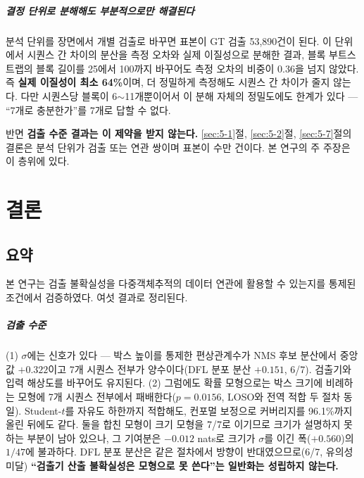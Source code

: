 \documentclass[12pt,a4paper,oneside]{report}
\begin{document}
\paragraph{결정 단위로 분해해도 부분적으로만 해결된다} 분석 단위를 장면에서 개별 검출로 바꾸면 표본이 GT 검출 53{,}890건이 된다. 이 단위에서 시퀀스 간 차이의 분산을 측정 오차와 실제 이질성으로 분해한 결과, 블록 부트스트랩의 블록 길이를 25에서 100까지 바꾸어도 측정 오차의 비중이 0.36을 넘지 않았다. 즉 \textbf{실제 이질성이 최소 64\%}이며, 더 정밀하게 측정해도 시퀀스 간 차이가 줄지 않는다. 다만 시퀀스당 블록이 6$\sim$11개뿐이어서 이 분해 자체의 정밀도에도 한계가 있다 --- ``7개로 충분한가''를 7개로 답할 수 없다.

반면 \textbf{검출 수준 결과는 이 제약을 받지 않는다.} \ref{sec:5-1}절, \ref{sec:5-2}절, \ref{sec:5-7}절의 결론은 분석 단위가 검출 또는 연관 쌍이며 표본이 수만 건이다. 본 연구의 주 주장은 이 층위에 있다.

\chapter{결론}

\section{요약}\label{sec:7-1}

본 연구는 검출 불확실성을 다중객체추적의 데이터 연관에 활용할 수 있는지를 통제된 조건에서 검증하였다. 여섯 결과로 정리된다.

\paragraph{검출 수준} (1) $\sigma$에는 신호가 있다 --- 박스 높이를 통제한 편상관계수가 NMS 후보 분산에서 중앙값 $+0.322$이고 7개 시퀀스 전부가 양수이다(DFL 분포 분산 $+0.151$, 6/7). 검출기와 입력 해상도를 바꾸어도 유지된다. (2) 그럼에도 확률 모형으로는 박스 크기에 비례하는 모형에 7개 시퀀스 전부에서 패배한다($p = 0.0156$, LOSO와 전역 적합 두 절차 동일). Student-$t$를 자유도 하한까지 적합해도, 컨포멀 보정으로 커버리지를 96.1\%까지 올린 뒤에도 같다. 둘을 합친 모형이 크기 모형을 7/7로 이기므로 크기가 설명하지 못하는 부분이 남아 있으나, 그 기여분은 $-0.012$ nats로 크기가 $\sigma$를 이긴 폭($+0.560$)의 $1/47$에 불과하다. DFL 분포 분산은 같은 절차에서 방향이 반대였으므로(6/7, 유의성 미달) \textbf{``검출기 산출 불확실성은 모형으로 못 쓴다''는 일반화는 성립하지 않는다.}
\end{document}
